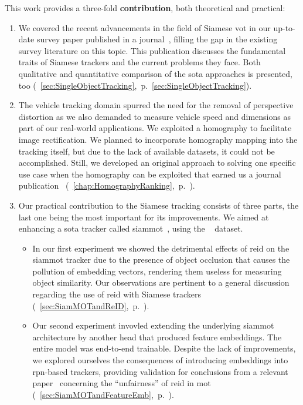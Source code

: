 This work provides a three-fold \textbf{contribution}, both theoretical and practical:
\begin{enumerate}
    \item We covered the recent advancements in the field of Siamese \gls{vot} in our up-to-date survey paper published in a journal~\cite{ondrasovic2021siamese}, filling the gap in the existing survey literature on this topic. This publication discusses the fundamental traits of Siamese trackers and the current problems they face. Both qualitative and quantitative comparison of the \gls{sota} approaches is presented, too (\sectiontext{}~\ref{sec:SingleObjectTracking},~p.~\ref{sec:SingleObjectTracking}).
    \item The vehicle tracking domain spurred the need for the removal of perspective distortion as we also demanded to measure vehicle speed and dimensions as part of our real-world applications. We exploited a homography to facilitate image rectification. We planned to incorporate homography mapping into the tracking itself, but due to the lack of available datasets, it could not be accomplished. Still, we developed an original approach to solving one specific use case when the homography can be exploited that earned us a journal publication~\cite{ondrasovic2021homography} (\chaptertext{}~\ref{chap:HomographyRanking},~p.~\pageref{chap:HomographyRanking}).
    \item Our practical contribution to the Siamese tracking consists of three parts, the last one being the most important for its improvements. We aimed at enhancing a \gls{sota} tracker called \gls{siammot}~\cite{shuai2021siammot}, using the \uadetrac{}~\cite{wen2020uadetrac} dataset.
          \begin{itemize}
              \item In our first experiment we showed the detrimental effects of \gls{reid} on the \gls{siammot} tracker due to the presence of object occlusion that causes the pollution of embedding vectors, rendering them useless for measuring object similarity. Our observations are pertinent to a general discussion regarding the use of \gls{reid} with Siamese trackers (\sectiontext{}~\ref{sec:SiamMOTandReID},~p.~\pageref{sec:SiamMOTandReID}).
              \item Our second experiment invovled extending the underlying \gls{siammot} architecture by another head that produced feature embeddings. The entire model was end-to-end trainable. Despite the lack of improvements, we explored ourselves the consequences of introducing embeddings into \gls{rpn}-based trackers, providing validation for conclusions from a relevant paper~\cite{zhang2021fairmot} concerning the ``unfairness'' of \gls{reid} in \gls{mot} (\sectiontext{}~\ref{sec:SiamMOTandFeatureEmb},~p.~\pageref{sec:SiamMOTandFeatureEmb}).

\end{itemize}
\end{enumerate}
